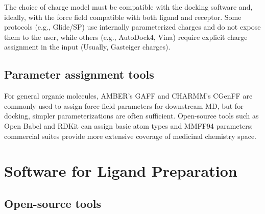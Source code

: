 \documentclass[12pt, a4paper]{article}
\begin{document}
The choice of charge model must be compatible with the docking software and, ideally, with the force field compatible with both ligand and receptor. Some protocols (e.g., Glide/SP) use internally parameterized charges and do not expose them to the user, while others (e.g., AutoDock4, Vina) require explicit charge assignment in the input (Usually, Gasteiger charges).

\subsection{Parameter assignment tools}

For general organic molecules, AMBER's GAFF\cite{CH6_gaff} and CHARMM's CGenFF\cite{CH6_cgenff} are commonly used to assign force-field parameters for downstream MD, but for docking, simpler parameterizations are often sufficient. Open-source tools such as Open Babel and RDKit can assign basic atom types and MMFF94 parameters; commercial suites provide more extensive coverage of medicinal chemistry space.

\section{Software for Ligand Preparation}

\subsection{Open-source tools}
\end{document}
